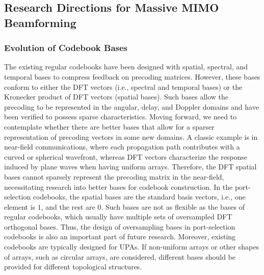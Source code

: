 \documentclass[lettersize,journal]{IEEEtran}
\begin{document}
\subsection{Research Directions for Massive MIMO Beamforming}

\subsubsection{Evolution of Codebook Bases}
The existing regular codebooks have been designed with spatial, spectral, and temporal bases to compress feedback on precoding matrices. However, these bases conform to either the DFT vectors (i.e., spectral and temporal bases) or the Kronecker product of DFT vectors (spatial bases). Such bases allow the precoding to be represented in the angular, delay, and Doppler domains and have been verified to possess sparse characteristics. Moving forward, we need to contemplate whether there are better bases that allow for a sparser representation of precoding vectors in some new domains. A classic example is in near-field communications, where each propagation path contributes with a curved or spherical wavefront, whereas DFT vectors characterize the response induced by plane waves when having uniform arrays. Therefore, the DFT spatial bases cannot sparsely represent the precoding matrix in the near-field, necessitating research into better bases for codebook construction. In the port-selection codebooks, the spatial bases are the standard basis vectors, i.e., one element is $1$, and the rest are $0$. Such bases are not as flexible as the bases of regular codebooks, which usually have multiple sets of oversampled DFT orthogonal bases. Thus, the design of oversampling bases in port-selection codebooks is also an important part of future research. Moreover, existing codebooks are typically designed for UPAs. If non-uniform arrays or other shapes of arrays, such as circular arrays, are considered, different bases should be provided for different topological structures.
\end{document}
